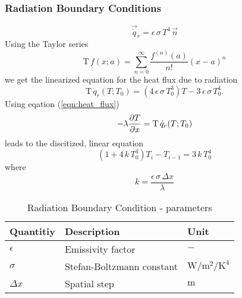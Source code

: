 \subsubsection{Radiation Boundary Conditions}
\begin{equation}
    \vec{\dot{q}}_r = \epsilon \, \sigma \, T^4 \, \vec n
\end{equation}
Using the Taylor series
\begin{equation}
    \mathrm{T} \, f(x;a) = \sum^{\infty}_{n = 0} \frac{f^{(n)}(a)}{n!}(x - a)^n
\end{equation}
we get the linearized equation for the heat flux due to radiation
\begin{equation}
    \mathrm{T} \, \dot{q}_r(T;T_0) = (4 \, \epsilon \, \sigma \, T_0^3) T - 3 \, \epsilon \, \sigma \, T_0^4.
\end{equation}
Using eqation (\ref{eqn:heat_flux})
\begin{equation}
    -\lambda \pdv{T}{x} = \mathrm{T} \, \dot{q}_r(T;T_0)
\end{equation}
leads to the discitized, linear equation
\begin{equation}
    \left( 1 + 4\,k\,T_0^3 \right) T_i - T_{i - 1}= 3\,k\,T_0^4
\end{equation}
where
\begin{equation}
    k = \frac{\epsilon\,\sigma\,\Delta x}{\lambda}
\end{equation}
\begin{table}[ht]
\centering
\caption{Radiation Boundary Condition - parameters}
\begin{tabular}{lll}
\hline
\hline
Quantitiy & Description & Unit\\
\hline
$\epsilon$ & Emissivity factor & $-$\\
$\sigma$ & Stefan-Boltzmann constant & $\si{\watt\per\meter\squared\per\kelvin\tothe{4}}$\\
$\Delta x$ & Spatial step & $\si{\meter}$\\
\hline
\hline
\end{tabular}
\end{table}

